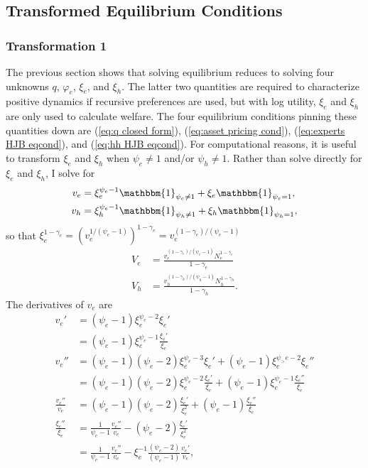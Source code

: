 \documentclass[12 pt, oneside]{article}
\theoremstyle{definition}
\theoremstyle{definition}
\theoremstyle{definition}
\begin{document}
\subsection{Transformed Equilibrium Conditions}

\subsubsection{Transformation 1}
The previous section shows that solving equilibrium reduces to solving four unknowns  $q$, $\varphi_e$, $\xi_e$, and $\xi_h$. The latter two quantities are required to characterize positive dynamics if recursive preferences are used, but with log utility, $\xi_e$ and $\xi_h$ are only used to calculate welfare.  The four equilibrium conditions pinning these quantities down are (\ref{eq:q closed form}), (\ref{eq:asset pricing cond}), (\ref{eq:experts HJB eqcond}), and (\ref{eq:hh HJB eqcond}). For computational reasons, it is useful to transform $\xi_e$ and $\xi_h$ when $\psi_e \neq 1$ and/or $\psi_h\neq 1$. Rather than solve directly for $\xi_e$ and $\xi_h$, I solve for
\begin{align}
\label{eq:ve transform}
  v_e &  = \xi_e^{\psi_e - 1}\mathbbm{1}_{\psi_e \neq 1} + \xi_e\mathbbm{1}_{\psi_e = 1},\\
\label{eq:vh transform}
  v_h & = \xi_h^{\psi_e - 1}\mathbbm{1}_{\psi_h \neq 1} + \xi_h\mathbbm{1}_{\psi_h = 1},
\end{align}
so that $\xi_e^{1 - \gamma_e} = (v_e^{1 / (\psi_e - 1)} )^{1 - \gamma_e} = v_e^{(1 - \gamma_e) / ( \psi_e - 1)}$
\begin{align}\label{eq:value function Ve transform}
  V_e & = \frac{v_e^{(1- \gamma_e) / (\psi_e - 1)} N_e^{1  - \gamma_e}}{1 - \gamma_e}\\
  V_h & = \frac{v_h^{(1- \gamma_h) / (\psi_h - 1)} N_h^{1  - \gamma_h}}{1 - \gamma_h}.
\end{align}
The derivatives of $v_e$ are
\begin{align*}
  v_e' & = (\psi_e - 1)\xi_e^{\psi_e - 2}\xi_e'\\
       & = (\psi_e - 1)\xi_e^{\psi_e - 1}\frac{\xi_e'}{\xi_e}\\
  v_e'' & =(\psi_e - 1)(\psi_e - 2)\xi_e^{\psi_e - 3}\xi_e' + (\psi_e - 1)\xi_e^{\psi_>e - 2}\xi_e''\\
       & = (\psi_e - 1)(\psi_e - 2)\xi_e^{\psi_e - 2}\frac{\xi_e'}{\xi_e} + (\psi_e - 1)\xi_e^{\psi_e - 1}\frac{\xi_e''}{\xi_e}\\
\frac{v_e''}{v_e} & = (\psi_e - 1)(\psi_e - 2)\frac{\xi_e'}{\xi_e^2} + (\psi_e - 1)\frac{\xi_e''}{\xi_e}\\
  \frac{\xi_e''}{\xi_e} & = \frac{1}{\psi_e - 1}\frac{v_e''}{v_e} - (\psi_e - 2)\frac{\xi_e'}{\xi_e^2}\\
       & =  \frac{1}{\psi_e - 1}\frac{v_e''}{v_e} - \xi_e^{-1} \frac{(\psi_e - 2)}{(\psi_e - 1)}\frac{v_e'}{v_e},
\end{align*}
\end{document}
